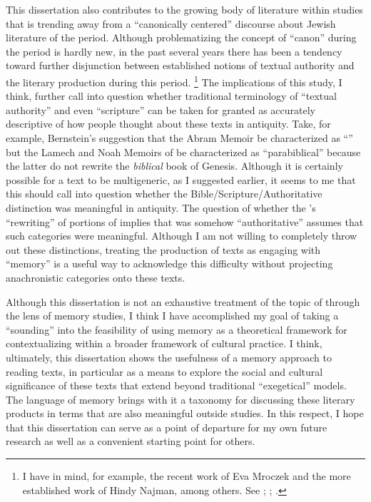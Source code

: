 This dissertation also contributes to the growing body of literature within \secondtemple studies that is trending away from a ``canonically centered'' discourse about Jewish literature of the \secondtemple period. Although problematizing the concept of ``canon'' during the \secondtemple period is hardly new, in the past several years there has been a tendency toward further disjunction between established notions of textual authority and the literary production during this period.%
    \footnote{I have in mind, for example, the recent work of Eva Mroczek and the more established work of Hindy Najman, among others. See \cite{mroczek2016}; \cite{najman_jsj2012}; \cite{najman2003}.}
The implications of this study, I think, further call into question whether traditional terminology of ``textual authority'' and even ``scripture'' can be taken for granted as accurately descriptive of how people thought about these texts in antiquity. Take, for example, Bernstein's suggestion that the Abram Memoir be characterized as  ``\rwb'' but the Lamech and Noah Memoirs of \ga be characterized as ``parabiblical'' because the latter do not rewrite the \emph{biblical} book of Genesis. Although it is certainly possible for a text to be multigeneric, as I suggested earlier, it seems to me that this should call into question whether the Bible/Scripture/Authoritative distinction was meaningful in antiquity. The question of whether the \ga's ``rewriting'' of portions of \firstenoch implies that \firstenoch was somehow ``authoritative'' assumes that such categories were meaningful. Although I am not willing to completely throw out these distinctions, treating the production of \rwb texts as engaging with ``memory'' is a useful way to acknowledge this difficulty without projecting anachronistic categories onto these texts.


Although this dissertation is not an exhaustive treatment of the topic of \rwb through the lens of memory studies, I think I have accomplished my goal of taking a ``sounding'' into the feasibility of using memory as a theoretical framework for contextualizing \rwb within a broader framework of cultural practice. I think, ultimately, this dissertation shows the usefulness of a memory approach to reading \rwb texts, in particular as a means to explore the social and cultural significance of these texts that extend beyond traditional ``exegetical'' models. The language of memory  brings with it a taxonomy for discussing these literary products in terms that are also meaningful outside \secondtemple studies. In this respect, I hope that this dissertation can serve as a point of departure for my own future research as well as a convenient starting point for others. 
